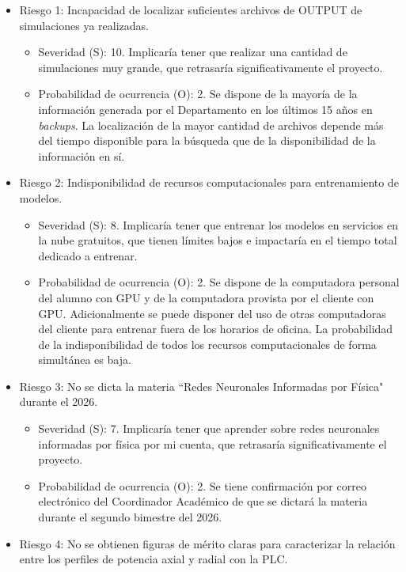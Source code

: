 \documentclass[
11pt, %
]{charter}
\begin{document}
\begin{itemize}
    \item Riesgo 1: Incapacidad de localizar suficientes archivos de OUTPUT de simulaciones ya realizadas.
    \begin{itemize}
        \item Severidad (S): 10. Implicaría tener que realizar una cantidad de simulaciones muy grande, que retrasaría significativamente el proyecto.
        \item Probabilidad de ocurrencia (O): 2. Se dispone de la mayoría de la información generada por el Departamento en los últimos 15 años en \textit{backups}. La localización de la mayor cantidad de archivos depende más del tiempo disponible para la búsqueda que de la disponibilidad de la información en sí.
    \end{itemize}
    \item Riesgo 2: Indisponibilidad de recursos computacionales para entrenamiento de modelos.
    \begin{itemize}
        \item Severidad (S): 8. Implicaría tener que entrenar los modelos en servicios en la nube gratuitos, que tienen límites bajos e impactaría en el tiempo total dedicado a entrenar.
        \item Probabilidad de ocurrencia (O): 2. Se dispone de la computadora personal del alumno con GPU y de la computadora provista por el cliente con GPU. Adicionalmente se puede disponer del uso de otras computadoras del cliente para entrenar fuera de los horarios de oficina. La probabilidad de la indisponibilidad de todos los recursos computacionales de forma simultánea es baja.
    \end{itemize}
    \item Riesgo 3: No se dicta la materia ``Redes Neuronales Informadas por Física" durante el 2026.
    \begin{itemize}
        \item Severidad (S): 7. Implicaría tener que aprender sobre redes neuronales informadas por física por mi cuenta, que retrasaría significativamente el proyecto.
        \item Probabilidad de ocurrencia (O): 2. Se tiene confirmación por correo electrónico del Coordinador Académico de que se dictará la materia durante el segundo bimestre del 2026.
    \end{itemize}
    \item Riesgo 4: No se obtienen figuras de mérito claras para caracterizar la relación entre los perfiles de potencia axial y radial con la PLC.

\end{itemize}
\end{document}
